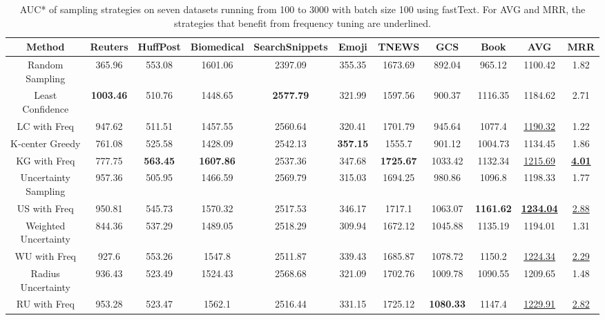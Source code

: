 \begin{table}[th]
	\centering
	\small
	\scriptsize
	\setlength{\abovecaptionskip}{0pt}
	\setlength{\belowcaptionskip}{0pt}
	\begin{tabular}{ccccccccc|cc}
		\toprule
Method & Reuters & HuffPost & Biomedical & SearchSnippets & Emoji & TNEWS & GCS & Book & AVG & MRR\\ \hline
Random Sampling & 365.96 & 553.08 & 1601.06 & 2397.09 & 355.35 & 1673.69 & 892.04 & 965.12 & 1100.42 & 1.82\\ \hline
Least Confidence & \textbf{1003.46} & 510.76 & 1448.65 & \textbf{2577.79} & 321.99 & 1597.56 & 900.37 & 1116.35 & 1184.62 & 2.71\\
LC with Freq & 947.62 & 511.51 & 1457.55 & 2560.64 & 320.41 & 1701.79 & 945.64 & 1077.4 & \underline{1190.32} & 1.22\\ \hline
K-center Greedy & 761.08 & 525.58 & 1428.09 & 2542.13 & \textbf{357.15} & 1555.7 & 901.12 & 1004.73 & 1134.45 & 1.86\\
KG with Freq & 777.75 & \textbf{563.45} & \textbf{1607.86} & 2537.36 & 347.68 & \textbf{1725.67} & 1033.42 & 1132.34 & \underline{1215.69} & \textbf{\underline{4.01}}\\ \hline        
Uncertainty Sampling & 957.36 & 505.95 & 1466.59 & 2569.79 & 315.03 & 1694.25 & 980.86 & 1096.8 & 1198.33 & 1.77\\
US with Freq & 950.81 & 545.73 & 1570.32 & 2517.53 & 346.17 & 1717.1 & 1063.07 & \textbf{1161.62} & \textbf{\underline{1234.04}} & \underline{2.88}\\ \hline
Weighted Uncertainty & 844.36 & 537.29 & 1489.05 & 2518.29 & 309.94 & 1672.12 & 1045.88 & 1135.19 & 1194.01 & 1.31\\
WU with Freq & 927.6 & 553.26 & 1547.8 & 2511.87 & 339.43 & 1685.87 & 1078.72 & 1150.2 & \underline{1224.34} & \underline{2.29}\\ \hline
Radius Uncertainty & 936.43 & 523.49 & 1524.43 & 2568.68 & 321.09 & 1702.76 & 1009.78 & 1090.55 & 1209.65 & 1.48\\
RU with Freq & 953.28 & 523.47 & 1562.1 & 2516.44 & 331.15 & 1725.12 & \textbf{1080.33} & 1147.4 & \underline{1229.91} & \underline{2.82}\\ \hline
	\end{tabular}
\caption{AUC* of sampling strategies on seven datasets running from 100 to 3000 with batch size 100 using fastText. For AVG and MRR, 
the strategies that benefit from frequency tuning are underlined.}
\label{table:auc_ft}
\end{table}

